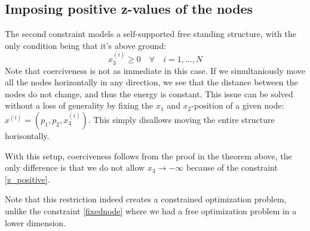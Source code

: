 \subsection{Imposing positive z-values of the nodes}
The second constraint models a self-supported free standing structure, with the only condition being that it's above ground:
\begin{equation}
    x_3^{(i)} \geq 0 \quad \forall \quad i = 1,...,N
    \label{z_positive}
\end{equation}
Note that coerciveness is not as immediate in this case. If we simultaniously move all the nodes horizontally in any direction, we see that the distance between the nodes do not change, and thus the energy is constant. This issue can be solved without a loss of generality by fixing the $x_1$ and $x_2$-position of a given node: $x^{(i)} = (p_1,p_2,x^{(i)}_3)$. This simply disallows moving the entire structure horisontally.

With this setup, coerciveness follows from the proof in the theorem above, the only difference is that we do not allow $x_3 \to -\infty$ because of the constraint \eqref{z_positive}.

Note that this restriction indeed creates a constrained optimization problem, unlike the constraint \eqref{fixednode} where we had a free optimization problem in a lower dimension.